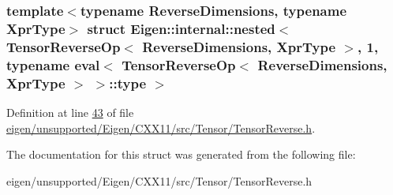 \subsubsection*{template$<$typename Reverse\+Dimensions, typename Xpr\+Type$>$\newline
struct Eigen\+::internal\+::nested$<$ Tensor\+Reverse\+Op$<$ Reverse\+Dimensions, Xpr\+Type $>$, 1, typename eval$<$ Tensor\+Reverse\+Op$<$ Reverse\+Dimensions, Xpr\+Type $>$ $>$\+::type $>$}



Definition at line \hyperlink{eigen_2unsupported_2_eigen_2_c_x_x11_2src_2_tensor_2_tensor_reverse_8h_source_l00043}{43} of file \hyperlink{eigen_2unsupported_2_eigen_2_c_x_x11_2src_2_tensor_2_tensor_reverse_8h_source}{eigen/unsupported/\+Eigen/\+C\+X\+X11/src/\+Tensor/\+Tensor\+Reverse.\+h}.



The documentation for this struct was generated from the following file\+:\begin{DoxyCompactItemize}
\item 
eigen/unsupported/\+Eigen/\+C\+X\+X11/src/\+Tensor/\+Tensor\+Reverse.\+h\end{DoxyCompactItemize}
